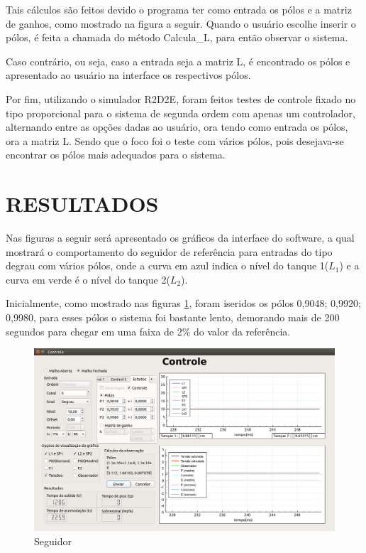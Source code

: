 \documentclass[a4paper,12pt]{article}
\begin{document}
\hspace{4ex}Tais cálculos são feitos devido o programa ter como entrada os pólos e a matriz de ganhos, como mostrado na figura a seguir. Quando o usuário escolhe inserir o pólos, é feita a chamada do método Calcula\_L, para então observar o sistema.



\hspace{4ex}Caso contrário, ou seja, caso a entrada seja a matriz L, é encontrado os pólos e apresentado ao usuário na interface os respectivos pólos.

\hspace{4ex}Por fim, utilizando o simulador R2D2E, foram feitos testes de controle fixado no tipo proporcional para o sistema de segunda ordem com apenas um controlador, alternando entre as opções dadas ao usuário, ora tendo como entrada os pólos, ora a matriz L. Sendo que o foco foi o teste com vários pólos, pois desejava-se encontrar os pólos mais adequados para o sistema. 




\newpage


\thispagestyle{main}

\section{RESULTADOS}
\hspace{4ex}Nas figuras a seguir será apresentado os gráficos da interface do software, a qual mostrará o comportamento do seguidor de referência para entradas do tipo degrau com vários pólos, onde a curva em azul indica o nível do tanque 1($L_1$) e a curva em verde é o nível do tanque 2($L_2$).

\hspace{4ex}Inicialmente, como mostrado nas figuras \ref{img1}, foram iseridos os pólos 0,9048; 0,9920; 0,9980, para esses pólos o sistema foi bastante lento, demorando mais de 200 segundos para chegar em uma faixa de 2\% do valor da referência.
\begin{figure}[H]
\centering
\includegraphics[width=13cm]{FotosSeguidor/PolosDados.png}
\caption{Seguidor}
\label{img1}
\end{figure}
\end{document}
